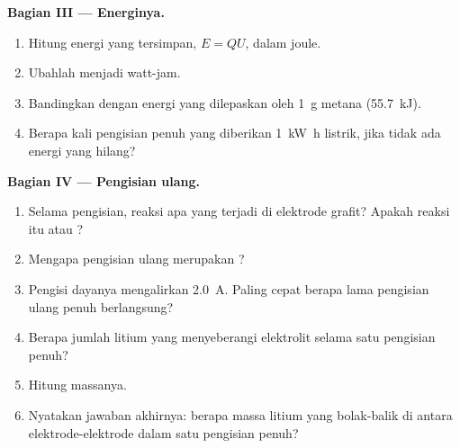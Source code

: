 \begin{problem}
\medskip
\noindent\textbf{Bagian III --- Energinya.}
\begin{enumerate}[resume]
  \item Hitung energi yang tersimpan, $E = Q U$, dalam joule.
  \item Ubahlah menjadi watt-jam.
  \item Bandingkan dengan energi yang dilepaskan oleh 
        \qty{1}{g} metana (\qty{55.7}{kJ}).
  \item Berapa kali pengisian penuh yang diberikan \qty{1}{kW.h}
        listrik, jika tidak ada energi yang hilang?
\end{enumerate}

\medskip
\noindent\textbf{Bagian IV --- Pengisian ulang.}
\begin{enumerate}[resume]
  \item Selama pengisian, reaksi apa yang terjadi di elektrode grafit?
        Apakah reaksi itu  atau ?
  \item Mengapa pengisian ulang merupakan ?
  \item Pengisi dayanya mengalirkan \qty{2.0}{A}. Paling cepat berapa
        lama pengisian ulang penuh berlangsung?
  \item Berapa jumlah  litium yang menyeberangi elektrolit selama
        satu pengisian penuh?
  \item Hitung massanya.
  \item Nyatakan jawaban akhirnya: berapa massa litium yang bolak-balik
        di antara elektrode-elektrode dalam satu pengisian penuh?
\end{enumerate}
\end{problem}
